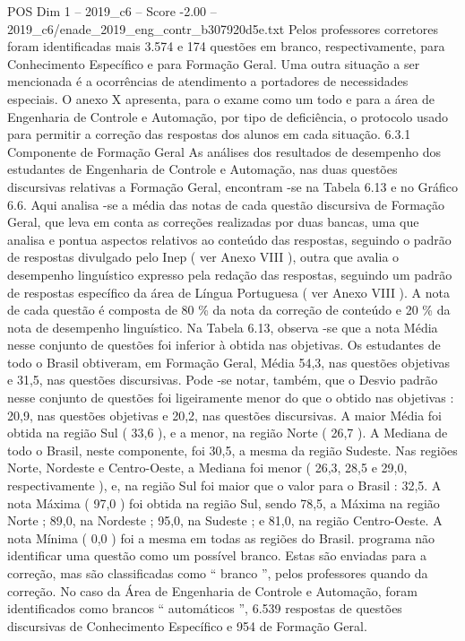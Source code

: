 \begin{textsample}{POS Dim 1 – 2019\_c6 – Score -2.00 – 2019\_c6/enade\_2019\_eng\_contr\_b307920d5e.txt}
Pelos professores corretores foram identificadas mais 3.574 e 174 questões em branco, respectivamente, para Conhecimento Específico e para Formação Geral.
Uma outra situação a ser mencionada é a ocorrências de atendimento a portadores de necessidades especiais.
O anexo X apresenta, para o exame como um todo e para a área de Engenharia de Controle e Automação, por tipo de deficiência, o protocolo usado para permitir a correção das respostas dos alunos em cada situação. 6.3.1 Componente de Formação Geral As análises dos resultados de desempenho dos estudantes de Engenharia de Controle e Automação, nas duas questões discursivas relativas a Formação Geral, encontram -se na Tabela 6.13 e no Gráfico 6.6.
Aqui analisa -se a média das notas de cada questão discursiva de Formação Geral, que leva em conta as correções realizadas por duas bancas, uma que analisa e pontua aspectos relativos ao conteúdo das respostas, seguindo o padrão de respostas divulgado pelo Inep ( ver Anexo VIII ), outra que avalia o desempenho linguístico expresso pela redação das respostas, seguindo um padrão de respostas específico da área de Língua Portuguesa ( ver Anexo VIII ).
A nota de cada questão é composta de 80 \% da nota da correção de conteúdo e 20 \% da nota de desempenho linguístico.
Na Tabela 6.13, observa -se que a nota Média nesse conjunto de questões foi inferior à obtida nas objetivas.
Os estudantes de todo o Brasil obtiveram, em Formação Geral, Média 54,3, nas questões objetivas e 31,5, nas questões discursivas.
Pode -se notar, também, que o Desvio padrão nesse conjunto de questões foi ligeiramente menor do que o obtido nas objetivas : 20,9, nas questões objetivas e 20,2, nas questões discursivas.
A maior Média foi obtida na região Sul ( 33,6 ), e a menor, na região Norte ( 26,7 ).
A Mediana de todo o Brasil, neste componente, foi 30,5, a mesma da região Sudeste.
Nas regiões Norte, Nordeste e Centro-Oeste, a Mediana foi menor ( 26,3, 28,5 e 29,0, respectivamente ), e, na região Sul foi maior que o valor para o Brasil : 32,5.
A nota Máxima ( 97,0 ) foi obtida na região Sul, sendo 78,5, a Máxima na região Norte ; 89,0, na Nordeste ; 95,0, na Sudeste ; e 81,0, na região Centro-Oeste.
A nota Mínima ( 0,0 ) foi a mesma em todas as regiões do Brasil. programa não identificar uma questão como um possível branco.
Estas são enviadas para a correção, mas são classificadas como “ branco ”, pelos professores quando da correção.
No caso da Área de Engenharia de Controle e Automação, foram identificados como brancos “ automáticos ”, 6.539 respostas de questões discursivas de Conhecimento Específico e 954 de Formação Geral.

\end{textsample}
